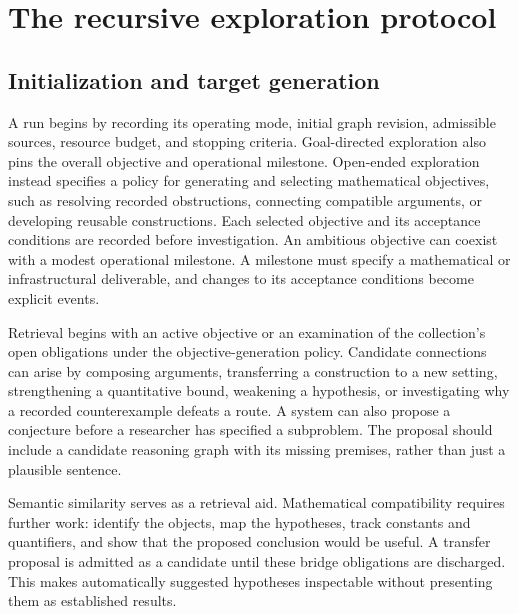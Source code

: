 \section{The recursive exploration protocol}\label{sec:protocol}

\subsection{Initialization and target generation}

A run begins by recording its operating mode, initial graph revision, admissible sources, resource budget, and stopping criteria. Goal-directed exploration also pins the overall objective and operational milestone. Open-ended exploration instead specifies a policy for generating and selecting mathematical objectives, such as resolving recorded obstructions, connecting compatible arguments, or developing reusable constructions. Each selected objective and its acceptance conditions are recorded before investigation. An ambitious objective can coexist with a modest operational milestone. A milestone must specify a mathematical or infrastructural deliverable, and changes to its acceptance conditions become explicit events.

Retrieval begins with an active objective or an examination of the collection's open obligations under the objective-generation policy. Candidate connections can arise by composing arguments, transferring a construction to a new setting, strengthening a quantitative bound, weakening a hypothesis, or investigating why a recorded counterexample defeats a route. A system can also propose a conjecture before a researcher has specified a subproblem. The proposal should include a candidate reasoning graph with its missing premises, rather than just a plausible sentence.

Semantic similarity serves as a retrieval aid. Mathematical compatibility requires further work: identify the objects, map the hypotheses, track constants and quantifiers, and show that the proposed conclusion would be useful. A transfer proposal is admitted as a candidate until these bridge obligations are discharged. This makes automatically suggested hypotheses inspectable without presenting them as established results.

